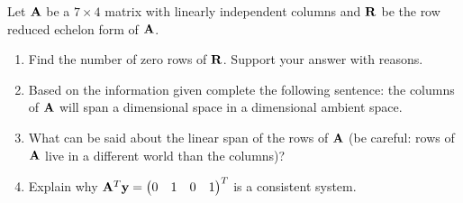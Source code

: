 \begin{problem}{\problemnum}
Let $\mathbf{A}$ be a $7 \times 4$ matrix with linearly independent columns and $\mathbf{R}$ be the row reduced echelon form of $\mathbf{A}$.
    \begin{enumerate}
        \item Find the number of zero rows of $\mathbf{R}$. Support your answer with reasons.
        \item Based on the information given complete the following sentence: \textsf{the columns of $\mathbf{A}$ will span a \makebox[0.5in]{\hrulefill} dimensional space in a \makebox[0.5in]{\hrulefill} dimensional ambient space.}
        \item What can be said about the linear span of the rows of $\mathbf{A}$ (be careful: rows of $\mathbf{A}$ live in a different world than the columns)?
        \item Explain why $\mathbf{A}^{T}\mathbf{y} = \begin{pmatrix}0&1&0&1\end{pmatrix}^{T}$ is a consistent system.
    \end{enumerate}
\end{problem}
